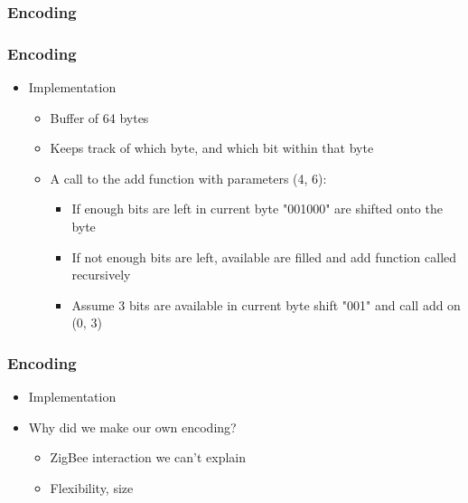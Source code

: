 \subsubsection{Encoding}
  \begin{frame}
  	\frametitle{Encoding}
  	\begin{itemize}
        \item Implementation 
    	\begin{itemize}
            \item Buffer of 64 bytes
            \item Keeps track of which byte, and which bit within that byte
            \item A call to the add function with parameters (4, 6):
            \begin{itemize}
                \item If enough bits are left in current byte "001000" are shifted onto the byte
                \item If not enough bits are left, available are filled and add function called recursively
                \item Assume 3 bits are available in current byte shift "001" and call add on (0, 3)
            \end{itemize}            
        \end{itemize}
    \end{itemize}          	
  \end{frame}

\begin{frame}
	\frametitle{Encoding}
    \begin{itemize}
        \item Implementation
		\item Why did we make our own encoding?
        \begin{itemize}
            \item ZigBee interaction we can't explain
            \item Flexibility, size
        \end{itemize}
    \end{itemize}
\end{frame}